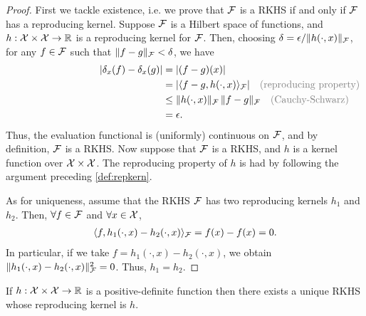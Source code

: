 \begin{proof}
  First we tackle existence, i.e. we prove that ${\mathcal F}$ is a RKHS if and only if ${\mathcal F}$ has a reproducing kernel.
  Suppose ${\mathcal F}$ is a Hilbert space of functions, and $h:{\mathcal X}\times{\mathcal X}\to\mathbb{R}$ is a reproducing kernel for ${\mathcal F}$.
  Then, choosing $\delta=\epsilon / \lVert h(\cdot,x)\rVert_{\mathcal F}$, for any $f \in {\mathcal F}$ such that $\lVert f-g\rVert_{\mathcal F} < \delta$, we have
  \begin{align*}
    \vert \delta_x (f) - \delta_x (g) \vert 
    &= \vert (f-g)(x) \vert \\
    &= |\ip{f-g,h(\cdot,x)}_\cF| \mycomment{(reproducing property)} \\
    &\leq \norm{h(\cdot,x)}_\cF \, \norm{f-g}_\cF \mycomment{(Cauchy-Schwarz)} \\
    &= \epsilon.
  \end{align*}
  Thus, the evaluation functional is (uniformly) continuous on ${\mathcal F}$, and by definition, ${\mathcal F}$ is a RKHS.
  Now suppose that ${\mathcal F}$ is a RKHS, and $h$ is a kernel function over ${\mathcal X}\times{\mathcal X}$.
  The reproducing property of $h$ is had by following the argument preceding \cref{def:repkern}.
 
  As for uniqueness, assume that the RKHS ${\mathcal F}$ has two reproducing kernels $h_1$ and $h_2$. 
  Then, $\forall f\in{\mathcal F}$ and $\forall x\in{\mathcal X}$,
  \begin{align*}
    \langle f,h_1(\cdot,x) - h_2(\cdot,x)\rangle_{\mathcal F} = f(x) - f(x) = 0.
  \end{align*}
  In particular, if we take $f = h_1(\cdot,x) - h_2(\cdot,x)$, we obtain $\lVert h_1(\cdot,x) - h_2(\cdot,x)\rVert^2_{\mathcal F} = 0$.
  Thus, $h_1=h_2$.
\end{proof}

\begin{theorem}\label{thm:moorea}
  If $h:{\mathcal X}\times{\mathcal X}\to\mathbb{R}$ is a positive-definite function then there exists a unique RKHS whose reproducing kernel is $h$.
\end{theorem}

